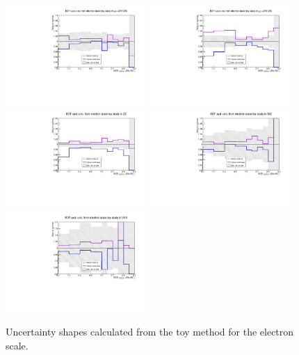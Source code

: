 \begin{figure}[htbp]
\begin{center}
\includegraphics[width=0.48\textwidth]{figures/syst_BDT_ZH_hinv_sm_toys_electron.pdf}
\includegraphics[width=0.48\textwidth]{figures/syst_BDT_ggZH_hinv_toys_electron.pdf}
\includegraphics[width=0.48\textwidth]{figures/syst_BDT_ZZ_toys_electron.pdf}
\includegraphics[width=0.48\textwidth]{figures/syst_BDT_WZ_toys_electron.pdf}
\includegraphics[width=0.48\textwidth]{figures/syst_BDT_VVV_toys_electron.pdf}
\caption{Uncertainty shapes calculated from the toy method for the electron scale.}
\label{fig:bdt_electron_scale}
\end{center}
\end{figure}

